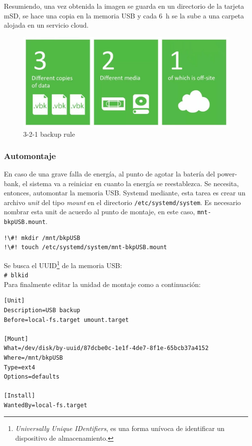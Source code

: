 \documentclass[10pt,a4paper]{article}
\begin{document}
Resumiendo, una vez obtenida la imagen se guarda en un directorio de la tarjeta mSD, se hace una copia en la memoria USB y cada \SI{6}{h} se la sube a una carpeta alojada en un servicio cloud.

\begin{figure}
\centering
    \includegraphics[scale=0.2]{321backup.jpg}
    \caption{3-2-1 backup rule}
    \label{fig:321bkp}
\end{figure}

\subsubsection{Automontaje}

En caso de una grave falla de energ\'ia, al punto de agotar la bater\'ia del power-bank, el sistema va a reiniciar en cuanto la energ\'ia se reestablezca. Se necesita, entonces, automontar la memoria USB. Systemd mediante, esta tarea es crear un archivo \emph{unit} del tipo \emph{mount} en el directorio \texttt{/etc/systemd/system}. Es necesario nombrar esta unit de acuerdo al punto de montaje, en este caso, \texttt{mnt-bkpUSB.mount}.
\begin{lstlisting}
!\#! mkdir /mnt/bkpUSB
!\#! touch /etc/systemd/system/mnt-bkpUSB.mount
\end{lstlisting}

Se busca el UUID\footnote{\emph{Universally Unique IDentifiers}, es una forma un\'ivoca de identificar un dispositivo de almacenamiento.} de la memoria USB:\\
\lstinline{# blkid}\\

Para finalmente editar la unidad de montaje como a continuaci\'on:
\begin{scriptsize}
\begin{mdframed}
\begin{verbatim}
[Unit]
Description=USB backup
Before=local-fs.target umount.target

[Mount]
What=/dev/disk/by-uuid/87dcbe0c-1e1f-4de7-8f1e-65bcb37a4152
Where=/mnt/bkpUSB
Type=ext4
Options=defaults

[Install]
WantedBy=local-fs.target
\end{verbatim}
\end{mdframed}
\end{scriptsize}
\end{document}
